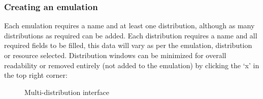 \documentclass[letterpaper,10pt,english]{sphinxhowto}
\begin{document}
\subsubsection{Creating an emulation}
\label{COCOMA/07_webUI:creating-an-emulation}
Each emulation requires a name and at least one distribution, although as many distributions as required can be added. Each distribution requires a name and all required fields to be filled, this data will vary as per the emulation, distribution or resource selected. Distribution windows can be minimized for overall readability or removed entirely (not added to the emulation) by clicking the `x' in the top right corner:
\begin{figure}[htbp]
\centering
\capstart

\caption{Multi-distribution interface}\end{figure}
\end{document}
